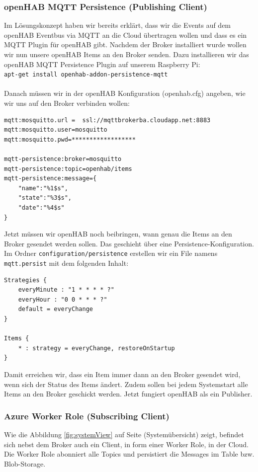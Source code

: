 \subsubsection{openHAB MQTT Persistence (Publishing Client)}
\label{sec:mqttPersistenceRealization}
Im Lösungskonzept haben wir bereits erklärt, dass wir die Events auf dem openHAB Eventbus via MQTT an die Cloud übertragen wollen und dass es ein MQTT Plugin für openHAB gibt. Nachdem der Broker installiert wurde wollen wir nun unsere openHAB Items an den Broker senden. Dazu installieren wir das openHAB MQTT Persistence Plugin auf unserem Raspberry Pi: \\
\lstinline!apt-get install openhab-addon-persistence-mqtt!
\\ \\
Danach müssen wir in der openHAB Konfiguration (openhab.cfg) angeben, wie wir uns auf den Broker verbinden wollen:
\begin{lstlisting}[style=csharp, caption=openhab.cfg - MQTT Config]
mqtt:mosquitto.url =  ssl://mqttbrokerba.cloudapp.net:8883
mqtt:mosquitto.user=mosquitto
mqtt:mosquitto.pwd=******************

mqtt-persistence:broker=mosquitto
mqtt-persistence:topic=openhab/items
mqtt-persistence:message={
	"name":"%1$s",
	"state":"%3$s", 
	"date":"%4$s"
}
\end{lstlisting}

Jetzt müssen wir openHAB noch beibringen, wann genau die Items an den Broker gesendet werden sollen. Das geschieht über eine Persistence-Konfiguration. Im Ordner \lstinline!configuration/persistence! erstellen wir ein File namens \lstinline!mqtt.persist! mit dem folgenden Inhalt:

\begin{lstlisting}[style=csharp, caption=mqtt.persist]
Strategies {
	everyMinute : "1 * * * * ?"
	everyHour : "0 0 * * * ?"
	default = everyChange
}

Items {
	* : strategy = everyChange, restoreOnStartup
}
\end{lstlisting}

Damit erreichen wir, dass ein Item immer dann an den Broker gesendet wird, wenn sich der Status des Items ändert. Zudem sollen bei jedem Systemstart alle Items an den Broker geschickt werden. Jetzt fungiert openHAB als ein Publisher.


\subsubsection{Azure Worker Role (Subscribing Client)} \label{sssec:m2mqttClient}
Wie die Abbildung \ref{fig:systemView} auf Seite \pageref{fig:systemView} (Systemübersicht) zeigt, befindet sich nebst dem Broker auch ein Client, in form einer Worker Role, in der Cloud. Die Worker Role abonniert alle Topics und persistiert die Messages im Table bzw. Blob-Storage.

